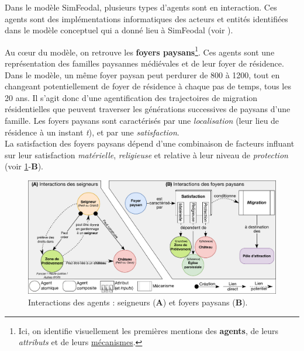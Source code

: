%		

Dans le modèle SimFeodal, plusieurs types d'agents sont en interaction. Ces agents sont des implémentations informatiques des acteurs et entités identifiées dans le modèle conceptuel qui a donné lieu à SimFeodal (voir \textcite[Tableau 1, \ppno~309--310]{cura_transition_2017}).

\noindent Au cœur du modèle, on retrouve les \textbf{foyers paysans}\footnote{
	Ici, on identifie visuellement les premières mentions des \textbf{agents}, de leurs \textit{attributs} et de leurs \ul{mécanismes}.
}.
Ces agents sont une représentation des familles paysannes médiévales et de leur foyer de résidence.
Dans le modèle, un même foyer paysan peut perdurer de 800 à 1200, tout en changeant potentiellement de foyer de résidence à chaque pas de temps, tous les 20 ans.
Il s'agit donc d'une agentification des trajectoires de migration résidentielles que peuvent traverser les générations successives de paysans d'une famille.
Les foyers paysans sont caractérisés par une \textit{localisation} (leur lieu de résidence à un instant \textit{t}), et par une \textit{satisfaction}.\\
La satisfaction des foyers paysans dépend d'une combinaison de facteurs influant sur leur satisfaction \textit{matérielle}, \textit{religieuse} et relative à leur niveau de \textit{protection} (voir \cref{fig:interactions-agents}-\textbf{B}).

\begin{figure}[H]
	\centering
	\includegraphics[width=\linewidth]{img/agents_interactions.pdf}
	\caption{Interactions des agents : seigneurs (\textbf{A}) et foyers paysans (\textbf{B}).}
	\label{fig:interactions-agents}
\end{figure}

